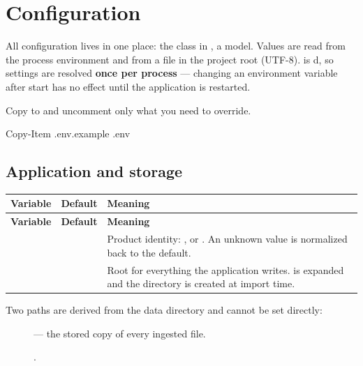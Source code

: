 \chapter{Configuration}
\label{ch:configuration}

All configuration lives in one place: the  class in
, a  model. Values are read from the
process environment and from a  file in the project root (UTF-8).
 is d, so settings are resolved
\textbf{once per process} --- changing an environment variable after start has
no effect until the application is restarted.

Copy  to  and uncomment only what you need to
override.

\begin{shellblock}
Copy-Item .env.example .env
\end{shellblock}

\section{Application and storage}

\begin{longtable}{L{0.26\textwidth} L{0.16\textwidth} L{0.46\textwidth}}
\toprule
\textbf{Variable} & \textbf{Default} & \textbf{Meaning} \\
\midrule
\endfirsthead
\toprule
\textbf{Variable} & \textbf{Default} & \textbf{Meaning} \\
\midrule
\endhead
\bottomrule
\endfoot
{} &  & Product identity: ,
 or . An unknown value is normalized back to the
default. \\
 &  & Root for everything the
application writes. \code{\textasciitilde} is expanded and the directory is
created at import time. \\
\end{longtable}

Two paths are derived from the data directory and cannot be set directly:

\begin{description}
\item[]  --- the stored copy of
every ingested file.
\item[] .
\end{description}

